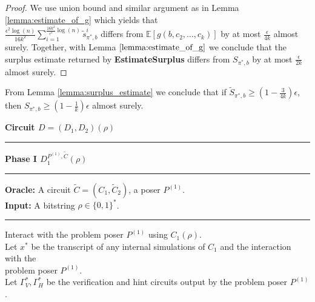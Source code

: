 \begin{proof}
We use union bound and similar argument as in Lemma \ref{lemma:estimate_of_g}
which yields that \\$\frac{\epsilon^2\log(n)}{16k^2} \sum_{i=1}^{\frac{16k^2}{\epsilon^2}\log(n)} \widetilde{s}_{\pi^*,b}^i$ differs from
$\mathbb{E}[g(b, c_2, \dots, c_k)]$ by at most $\frac{\epsilon}{4k}$ almost surely. Together, with Lemma $\ref{lemma:estimate_of_g}$ we conclude that the surplus estimate
returned by \textbf{EstimateSurplus} differs from $S_{\pi^*,b}$ by at most $\frac{\epsilon}{2k}$ almost surely.
\end{proof}
From Lemma \ref{lemma:surplus_estimate} we conclude that if $\widetilde{S}_{\pi^*,b} \geq (1-\frac{3}{4k})\epsilon$, then $S_{\pi^*,b} \geq (1-\frac{1}{k})\epsilon$ almost surely.
%
\begin{codeblock}
  \textbf{Circuit $D = (D_1, D_2) (\rho)$}
  \medskip \hrule \medskip
  \textbf{Phase I $D_1^{P^{(1)}, \widetilde{C}}(\rho)$}
  \medskip \hrule \medskip
  \textbf{Oracle:} A circuit $\widetilde{C} = (C_1, \widetilde{C}_2)$, a poser $P^{(1)}$.\\
  \textbf{Input:} A bitstring $\rho \in \{0,1\}^{*}$.
  \medskip\hrule\medskip

  Interact with the problem poser $P^{(1)}$ using $C_1(\rho)$. \\
  \IndI Let $x^*$ be the transcript of any internal simulations of $C_1$ and the interaction with the  \\ \IndI problem poser $P^{(1)}$.\\
  \IndI Let $\Gamma_V^*, \Gamma_H^*$ be the verification and hint circuits output by the problem poser $P^{(1)}$.


\end{codeblock}
